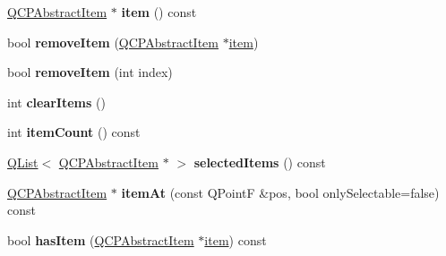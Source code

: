 \begin{DoxyCompactItemize}
\item 
\hyperlink{class_q_c_p_abstract_item}{Q\+C\+P\+Abstract\+Item} $\ast$ {\bfseries item} () const \hypertarget{class_q_custom_plot_a49bfcb69640dd36412fd739c77e2e73e}{}\label{class_q_custom_plot_a49bfcb69640dd36412fd739c77e2e73e}

\item 
bool {\bfseries remove\+Item} (\hyperlink{class_q_c_p_abstract_item}{Q\+C\+P\+Abstract\+Item} $\ast$\hyperlink{class_q_custom_plot_a3e842b5a65b1d17fbb96cfb1fa1314d1}{item})\hypertarget{class_q_custom_plot_ae04446557292551e8fb6e2c106e1848d}{}\label{class_q_custom_plot_ae04446557292551e8fb6e2c106e1848d}

\item 
bool {\bfseries remove\+Item} (int index)\hypertarget{class_q_custom_plot_abcfdda3d601c0441cab136137d715dea}{}\label{class_q_custom_plot_abcfdda3d601c0441cab136137d715dea}

\item 
int {\bfseries clear\+Items} ()\hypertarget{class_q_custom_plot_abdfd07d4f0591d0cf967f85013fd3645}{}\label{class_q_custom_plot_abdfd07d4f0591d0cf967f85013fd3645}

\item 
int {\bfseries item\+Count} () const \hypertarget{class_q_custom_plot_a6fc860e30df17fd5c46056bf6fe29390}{}\label{class_q_custom_plot_a6fc860e30df17fd5c46056bf6fe29390}

\item 
\hyperlink{class_q_list}{Q\+List}$<$ \hyperlink{class_q_c_p_abstract_item}{Q\+C\+P\+Abstract\+Item} $\ast$ $>$ {\bfseries selected\+Items} () const \hypertarget{class_q_custom_plot_ad237a5162acd30d23ce520ae7a8b86cb}{}\label{class_q_custom_plot_ad237a5162acd30d23ce520ae7a8b86cb}

\item 
\hyperlink{class_q_c_p_abstract_item}{Q\+C\+P\+Abstract\+Item} $\ast$ {\bfseries item\+At} (const Q\+PointF \&pos, bool only\+Selectable=false) const \hypertarget{class_q_custom_plot_a2a57aab52dd449f3c8c1e64394e06ae5}{}\label{class_q_custom_plot_a2a57aab52dd449f3c8c1e64394e06ae5}

\item 
bool {\bfseries has\+Item} (\hyperlink{class_q_c_p_abstract_item}{Q\+C\+P\+Abstract\+Item} $\ast$\hyperlink{class_q_custom_plot_a3e842b5a65b1d17fbb96cfb1fa1314d1}{item}) const \hypertarget{class_q_custom_plot_ab4199c38b03e63a2623c82453fe8add5}{}\label{class_q_custom_plot_ab4199c38b03e63a2623c82453fe8add5}


\end{DoxyCompactItemize}
